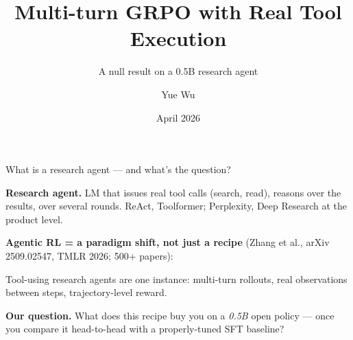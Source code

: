 \documentclass[aspectratio=169]{beamer}
\title{Multi-turn GRPO with Real Tool Execution}
\subtitle{A null result on a 0.5B research agent}
\author{Yue Wu}
\date{April 2026}
\begin{document}
\maketitle
%

\begin{frame}{What is a research agent --- and what's the question?}

\textbf{Research agent.} LM that issues real tool calls
(search, read), reasons over the results, over several rounds.
ReAct, Toolformer; Perplexity, Deep Research at the product level.

\vspace{0.4em}

\textbf{Agentic RL = a paradigm shift, not just a recipe} (Zhang
et al., arXiv 2509.02547, TMLR 2026; 500+ papers):
\begin{center}
\end{center}
Tool-using research agents are one instance: multi-turn rollouts,
real observations between steps, trajectory-level reward.

\vspace{0.4em}

\textbf{Our question.}\;
What does this recipe buy you on a \emph{0.5B} open policy --- once
you compare it head-to-head with a properly-tuned SFT baseline?


\end{frame}
\end{document}
